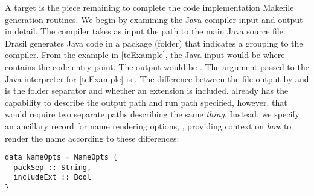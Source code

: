 {{{{{%
% 

%

A  target is the piece remaining to complete the code implementation Makefile generation routines. We begin by examining the Java compiler input and output in detail. The compiler takes as input the path to the main Java source file. Drasil generates Java code in a package (folder) that indicates a grouping to the  compiler. From the example in \autoref{teExample}, the Java input would be  where  contains the code entry point. The output would be . The argument passed to the Java interpreter for \autoref{teExample} is . The difference between the file output by  and  is the folder separator and whether an extension is included.  already has the capability to describe the output path and run path specified, however, that would require two separate paths describing the same \textit{thing}. Instead, we specify an ancillary record for name rendering options, , providing context on \textit{how} to render the name according to these differences:

\begin{tcolorbox}
\begin{verbatim}
data NameOpts = NameOpts {
  packSep :: String,
  includeExt :: Bool
}


\end{verbatim}
\end{tcolorbox}}}}}}
